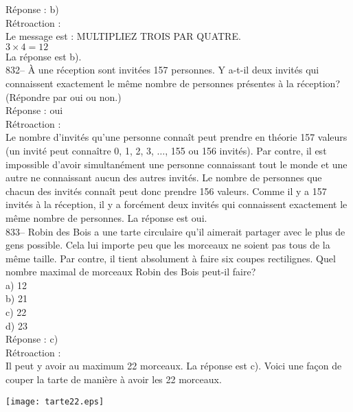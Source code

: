 ﻿\documentclass[letterpaper, 12pt]{article}
\begin{document}
R\'eponse : b)\\

R\'etroaction : \\
Le message est : \og MULTIPLIEZ TROIS PAR QUATRE\fg.\\
$3\times4=12$\\
La r\'eponse est b).\\


832-- \`A une r\'eception sont invit\'ees 157 personnes.  Y a-t-il deux
invit\'es qui connaissent exactement le m\^eme nombre de personnes
pr\'esentes \`a la r\'eception? (R\'epondre par oui ou non.)\\

R\'eponse : oui\\

R\'etroaction : \\
Le nombre d'invit\'es qu'une personne conna\^it peut prendre en th\'eorie
157 valeurs (un invit\'e peut conna\^itre 0, 1, 2, 3, $\ldots$, 155 ou 156
invit\'es).  Par contre, il est impossible d'avoir simultan\'ement une
personne connaissant tout le monde et une autre ne connaissant aucun des
autres invit\'es.  Le nombre de personnes que chacun des invit\'es conna\^it
peut donc prendre 156 valeurs.  Comme il y a 157 invit\'es \`a la
r\'eception, il y a forc\'ement deux invit\'es qui connaissent exactement le
m\^eme nombre de personnes.  La r\'eponse est oui.\\

833-- Robin des Bois a une tarte circulaire qu'il aimerait partager avec le
plus de gens possible.  Cela lui importe peu que les morceaux ne soient pas
tous de la m\^eme taille.  Par contre, il tient absolument \`a faire six
coupes rectilignes.  Quel nombre maximal de morceaux Robin des Bois peut-il
faire?\\
a) 12\\
b) 21\\
c) 22\\
d) 23\\

R\'eponse : c)\\

R\'etroaction : \\
Il peut y avoir au maximum 22 morceaux.  La r\'eponse est c).  Voici une
fa\c con de couper la tarte de mani\`ere \`a avoir les 22 morceaux.\\
    \begin{center}
    \texttt{[image: tarte22.eps]}
    \end{center}
\end{document}
